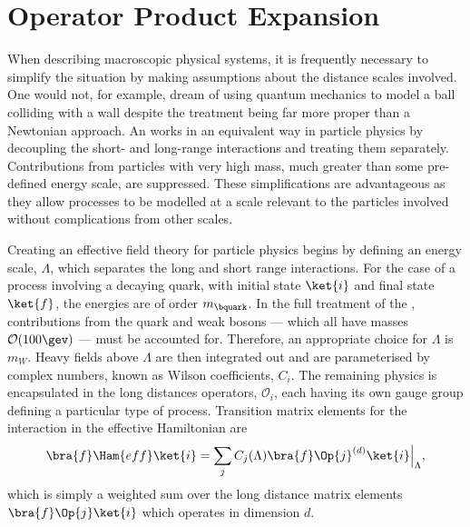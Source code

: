\section{Operator Product Expansion}

When describing macroscopic physical systems, it is frequently necessary to simplify the situation
by making assumptions about the distance scales involved.
One would not, for example, dream of using quantum mechanics to model a ball colliding with a wall
despite the treatment being far more proper than a Newtonian approach.
An \EFT works in an equivalent way in particle physics
by decoupling the short- and long-range interactions and treating them separately.
Contributions from particles with very high mass, much greater than some pre-defined energy scale,
are suppressed.
These simplifications are advantageous as they allow processes to be modelled at a scale
relevant to the particles involved without complications from other scales.

Creating an effective field theory for particle physics begins by defining an energy scale,
$\Lambda$, which separates the long and short range interactions.
For the case of a process involving a decaying \bquark quark, with initial state $\ket{i}$ and
final state $\ket{f}$,
the energies are of order $m_\bquark$.
In the full treatment of the \sm, contributions from the \tquark quark and weak bosons --- which all
have masses $\mathcal{O}(100\gev)$ --- must be accounted for.
Therefore, an appropriate choice for $\Lambda$ is \approx$m_W$.
Heavy fields above $\Lambda$ are then integrated out and are parameterised by complex numbers,
known as Wilson coefficients, $C_i$.
The remaining physics is encapsulated in the long distances operators, $\mathcal{O}_i$, each having
its own gauge group defining a particular type of process.
Transition matrix elements for the interaction in the effective Hamiltonian are
\begin{equation}
  \bra{f}\Ham{eff}\ket{i} =
  \sum_j C_j(\Lambda)\bra{f}\Op{j}^{(d)}\ket{i}\Big|_{\Lambda},
  \label{eq:th:opeham}
\end{equation}
which is simply a weighted sum over the long distance matrix elements $\bra{f}\Op{j}\ket{i}$ which
operates in dimension $d$.

